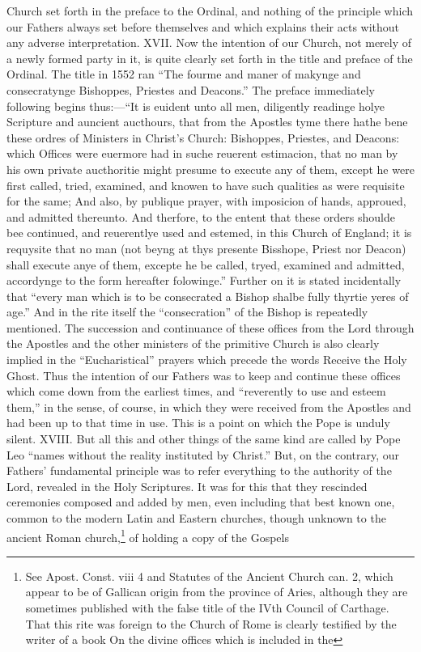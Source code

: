 Church set forth in the preface to the Ordinal, and nothing of the principle which our Fathers always set before themselves and which explains their acts without any adverse interpretation. XVII. Now the intention of our Church, not merely of a newly formed party in it, is quite clearly set forth in the title and preface of the Ordinal. The title in 1552 ran “The fourme and maner of makynge and consecratynge Bishoppes, Priestes and Deacons.” The preface immediately following begins thus:—“It is euident unto all men, diligently readinge holye Scripture and auncient aucthours, that from the Apostles tyme there hathe bene these ordres of Ministers in Christ’s Church: Bishoppes, Priestes, and Deacons: which Offices were euermore had in suche reuerent estimacion, that no man by his own private aucthoritie might presume to execute any of them, except he were first called, tried, examined, and knowen to have such qualities as were requisite for the same; And also, by publique prayer, with imposicion of hands, approued, and admitted thereunto. And therfore, to the entent that these orders shoulde bee continued, and reuerentlye used and estemed, in this Church of England; it is requysite that no man (not beyng at thys presente Bisshope, Priest nor Deacon) shall execute anye of them, excepte he be called, tryed, examined and admitted, accordynge to the form hereafter folowinge.” Further on it is stated incidentally that “every man which is to be consecrated a Bishop shalbe fully thyrtie yeres of age.” And in the rite itself the “consecration” of the Bishop is repeatedly mentioned. The succession and continuance of these offices from the Lord through the Apostles and the other ministers of the primitive Church is also clearly implied in the “Eucharistical” prayers which precede the words Receive the Holy Ghost. Thus the intention of our Fathers was to keep and continue these offices which come down from the earliest times, and “reverently to use and esteem them,” in the sense, of course, in which they were received from the Apostles and had been up to that time in use. This is a point on which the Pope is unduly silent. XVIII. But all this and other things of the same kind are called by Pope Leo “names without the reality instituted by Christ.” But, on the contrary, our Fathers’ fundamental principle was to refer everything to the authority of the Lord, revealed in the Holy Scriptures. It was for this that they rescinded ceremonies composed and added by men, even including that best known one, common to the modern Latin and Eastern churches, though unknown to the ancient Roman church,\footnote{See Apost. Const. viii 4 and Statutes of the Ancient Church can. 2, which appear to be of Gallican origin from the province of Aries, although they are sometimes published with the false title of the IVth Council of Carthage. That this rite was foreign to the Church of Rome is clearly testified by the writer of a book On the divine offices which is included in the} of holding a copy of the Gospels

